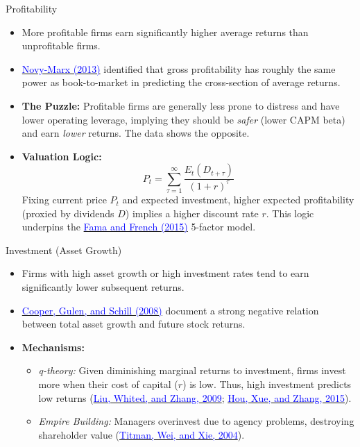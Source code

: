 \documentclass{beamer}
\begin{document}
\begin{frame}{Profitability}
	\begin{itemize}
		\item More profitable firms earn significantly higher average returns than unprofitable firms.
		\item \href{https://doi.org/10.1016/j.jfineco.2013.01.003}{\textcolor{blue}{Novy-Marx (2013)}} identified that gross profitability has roughly the same power as book-to-market in predicting the cross-section of average returns.
		\item \textbf{The Puzzle:} Profitable firms are generally less prone to distress and have lower operating leverage, implying they should be \textit{safer} (lower CAPM beta) and earn \textit{lower} returns. The data shows the opposite.
		\item \textbf{Valuation Logic:}
		$$ P_t = \sum_{\tau=1}^{\infty} \frac{E_t(D_{t+\tau})}{(1+r)^\tau} $$
		Fixing current price $P_t$ and expected investment, higher expected profitability (proxied by dividends $D$) implies a higher discount rate $r$. This logic underpins the \href{https://doi.org/10.1016/j.jfineco.2014.10.010}{\textcolor{blue}{Fama and French (2015)}} 5-factor model.
	\end{itemize}
\end{frame}

\begin{frame}{Investment (Asset Growth)}
	\begin{itemize}
		\item Firms with high asset growth or high investment rates tend to earn significantly lower subsequent returns.
		\item \href{https://doi.org/10.1111/j.1540-6261.2008.01370.x}{\textcolor{blue}{Cooper, Gulen, and Schill (2008)}} document a strong negative relation between total asset growth and future stock returns.
		\item \textbf{Mechanisms:}
		\begin{itemize}
			\item \textit{q-theory:} Given diminishing marginal returns to investment, firms invest more when their cost of capital ($r$) is low. Thus, high investment predicts low returns (\href{https://doi.org/10.1086/649760}{\textcolor{blue}{Liu, Whited, and Zhang, 2009}}; \href{https://doi.org/10.1093/rfs/hhu068}{\textcolor{blue}{Hou, Xue, and Zhang, 2015}}).
			\item \textit{Empire Building:} Managers overinvest due to agency problems, destroying shareholder value (\href{https://doi.org/10.1017/S0022109000003173}{\textcolor{blue}{Titman, Wei, and Xie, 2004}}).
		\end{itemize}
	\end{itemize}
\end{frame}
\end{document}

